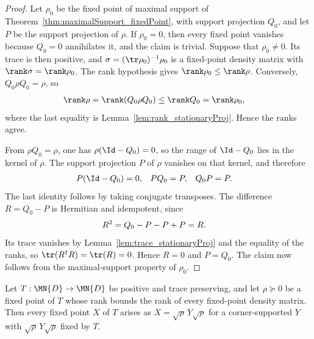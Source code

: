 \begin{proof}
    \leanok
    Let $\rho_0$ be the fixed point of maximal support of
    Theorem~\ref{thm:maximalSupport_fixedPoint}, with support projection
    $Q_0$, and let $P$ be the support projection of $\rho$. If $\rho_0=0$,
    then every fixed point vanishes because $Q_0=0$ annihilates it, and the
    claim is trivial. Suppose that $\rho_0\neq0$. Its trace is then
    positive, and $\sigma=(\tr\rho_0)^{-1}\rho_0$ is a fixed-point density
    matrix with $\rank\sigma=\rank\rho_0$. The rank hypothesis gives
    $\rank\rho_0\leq\rank\rho$. Conversely, $Q_0\rho Q_0=\rho$, so
    \begin{align}
        \rank\rho
         & =\rank(Q_0\rho Q_0)
        \leq\rank Q_0
        =\rank\rho_0,
        \notag
    \end{align}
    where the last equality is
    Lemma~\ref{lem:rank_stationaryProj}. Hence the ranks agree.

    From $\rho Q_0=\rho$, one has $\rho(\Id-Q_0)=0$, so the range of
    $\Id-Q_0$ lies in the kernel of $\rho$. The support projection $P$ of
    $\rho$ vanishes on that kernel, and therefore
    \begin{align}
        P(\Id-Q_0) & =0,
                   &
        PQ_0       & =P,
                   &
        Q_0P       & =P.
        \notag
    \end{align}
    The last identity follows by taking conjugate transposes. The difference
    $R=Q_0-P$ is Hermitian and idempotent, since
    \begin{align}
        R^2
         & =Q_0-P-P+P=R.
        \notag
    \end{align}
    Its trace vanishes by Lemma~\ref{lem:trace_stationaryProj} and the
    equality of the ranks, so $\tr(R^\dagger R)=\tr(R)=0$. Hence $R=0$ and
    $P=Q_0$. The claim now follows from the maximal-support property of
    $\rho_0$.
\end{proof}

\begin{theorem}%
    \label{thm:weightedCorner_sqrt_eq_of_maximalRank}
    \leanok
    Let $T:\MN{D}\to\MN{D}$ be positive and trace preserving, and let
    $\rho\succeq0$ be a fixed point of $T$ whose rank bounds the rank of
    every fixed-point density matrix. Then every fixed point $X$ of $T$
    arises as $X=\sqrt{\rho}\,Y\sqrt{\rho}$ for a corner-supported $Y$ with
    $\sqrt{\rho}\,Y\sqrt{\rho}$ fixed by $T$.
\end{theorem}

